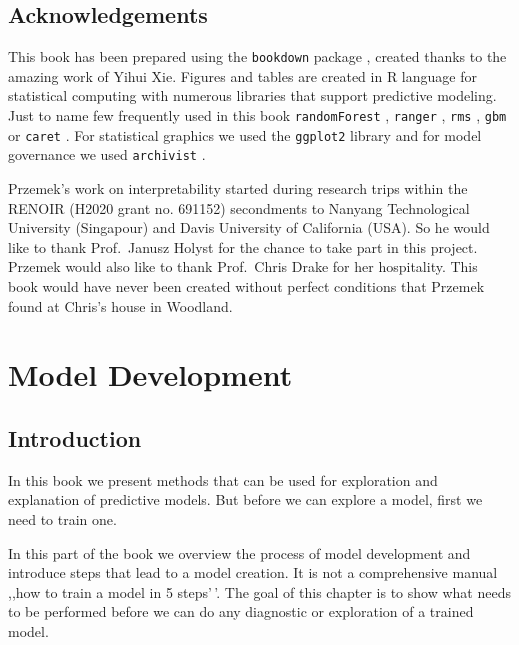 \documentclass[12pt,]{krantz}
\begin{document}
\hypertarget{thanksto}{%
\subsection{Acknowledgements}\label{thanksto}}

This book has been prepared using the \texttt{bookdown} package \citep{R-bookdown}, created thanks to the amazing work of Yihui Xie.
Figures and tables are created in R language for statistical computing \citep{RcoreT} with numerous libraries that support predictive modeling. Just to name few frequently used in this book \texttt{randomForest} \citep{randomForest}, \texttt{ranger} \citep{rangerRpackage}, \texttt{rms} \citep{rms}, \texttt{gbm} \citep{gbm} or \texttt{caret} \citep{caret}. For statistical graphics we used the \texttt{ggplot2} library \citep{ggplot2} and for model governance we used \texttt{archivist} \citep{archivist}.

Przemek's work on interpretability started during research trips within the RENOIR (H2020 grant no. 691152) secondments to Nanyang Technological University (Singapour) and Davis University of California (USA). So he would like to thank Prof.~Janusz Holyst for the chance to take part in this project. Przemek would also like to thank Prof.~Chris Drake for her hospitality. This book would have never been created without perfect conditions that Przemek found at Chris's house in Woodland.

\hypertarget{modelDevelopmentProcess}{%
\section{Model Development}\label{modelDevelopmentProcess}}

\hypertarget{MDPIntro}{%
\subsection{Introduction}\label{MDPIntro}}

In this book we present methods that can be used for exploration and explanation of predictive models. But before we can explore a model, first we need to train one.

In this part of the book we overview the process of model development and introduce steps that lead to a model creation. It is not a comprehensive manual ,,how to train a model in 5 steps'\,'. The goal of this chapter is to show what needs to be performed before we can do any diagnostic or exploration of a trained model.
\end{document}

